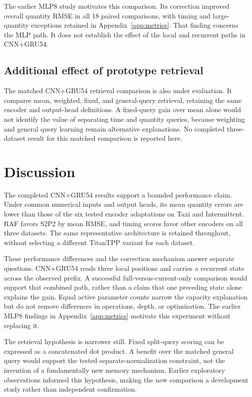 \documentclass[runningheads]{llncs}
\begin{document}
The earlier MLP8 study motivates this comparison. Its correction improved overall quantity RMSE in all 18 paired comparisons, with timing and large-quantity exceptions retained in Appendix~\ref{app:metrics}. That finding concerns the MLP path. It does not establish the effect of the local and recurrent paths in CNN+GRU54.

\subsection{Additional effect of prototype retrieval}
The matched CNN+GRU54 retrieval comparison is also under evaluation. It compares mean, weighted, fixed, and general-query retrieval, retaining the same encoder and output-head definitions. A fixed-query gain over mean alone would not identify the value of separating time and quantity queries, because weighting and general query learning remain alternative explanations. No completed three-dataset result for this matched comparison is reported here.

\section{Discussion}
The completed CNN+GRU54 results support a bounded performance claim. Under common numerical inputs and output heads, its mean quantity errors are lower than those of the six tested encoder adaptations on Taxi and Intermittent. RAF favors S2P2 by mean RMSE, and timing scores favor other encoders on all three datasets. The same representative architecture is retained throughout, without selecting a different TitanTPP variant for each dataset.

These performance differences and the correction mechanism answer separate questions. CNN+GRU54 reads three local positions and carries a recurrent state across the observed prefix. A successful full-versus-current-only comparison would support that combined path, rather than a claim that one preceding state alone explains the gain. Equal active parameter counts narrow the capacity explanation but do not remove differences in operations, depth, or optimization. The earlier MLP8 findings in Appendix~\ref{app:metrics} motivate this experiment without replacing it.

The retrieval hypothesis is narrower still. Fixed split-query scoring can be expressed as a concatenated dot product. A benefit over the matched general query would support the tested separate-normalization constraint, not the invention of a fundamentally new memory mechanism. Earlier exploratory observations informed this hypothesis, making the new comparison a development study rather than independent confirmation.
\end{document}
